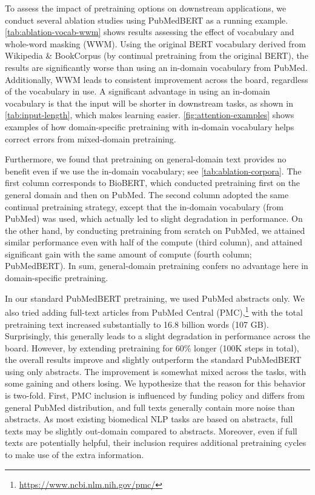 \documentclass[acmlarge,screen,nonacm]{acmart}
\begin{document}
To assess the impact of pretraining options on downstream applications, we conduct several ablation studies using PubMedBERT as a running example. 
\autoref{tab:ablation-vocab-wwm} shows results assessing the effect of vocabulary and whole-word masking (WWM). 
Using the original BERT vocabulary derived from Wikipedia \& BookCorpus (by continual pretraining from the original BERT), the results are significantly worse than using an in-domain vocabulary from PubMed. Additionally, WWM leads to consistent improvement across the board, regardless of the vocabulary in use. 
A significant advantage in using an in-domain vocabulary is that the input will be shorter in downstream tasks, as shown in \autoref{tab:input-length}, which makes learning easier. \autoref{fig:attention-examples} shows examples of how domain-specific pretraining with in-domain vocabulary helps correct errors from mixed-domain pretraining.  

Furthermore, we found that pretraining on general-domain text provides no benefit even if we use the in-domain vocabulary; see \autoref{tab:ablation-corpora}.
The first column corresponds to BioBERT, which conducted pretraining first on the general domain and then on PubMed. The second column adopted the same continual pretraining strategy, except that the in-domain vocabulary (from PubMed) was used, which actually led to slight degradation in performance. On the other hand, by conducting pretraining from scratch on PubMed, we attained similar performance even with half of the compute (third column), and attained significant gain with the same amount of compute (fourth column; PubMedBERT). In sum, general-domain pretraining confers no advantage here in domain-specific pretraining.  

In our standard PubMedBERT pretraining, we used PubMed abstracts only. We also tried adding full-text articles from PubMed Central (PMC),\footnote{\url{https://www.ncbi.nlm.nih.gov/pmc/}} with the total pretraining text increased substantially to 16.8 billion words (107 GB). Surprisingly, this generally leads to a slight degradation in performance across the board. However, by extending pretraining for 60\% longer (100K steps in total), the overall results improve and slightly outperform the standard PubMedBERT using only abstracts. The improvement is somewhat mixed across the tasks, with some gaining and others losing. We hypothesize that the reason for this behavior is two-fold. First, PMC inclusion is influenced by funding policy and differs from general PubMed distribution, and full texts generally contain more noise than abstracts. As most existing biomedical NLP tasks are based on abstracts, full texts may be slightly out-domain compared to abstracts. Moreover, even if full texts are potentially helpful, their inclusion requires additional pretraining cycles to make use of the extra information.
\end{document}
